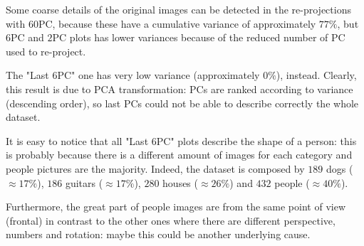 \documentclass[a4paper, 11pt]{article}
\begin{document}
	Some coarse details of the original images can be detected in the re-projections with $60$PC, because these have a cumulative variance of approximately $77\%$, but $6$PC and $2$PC plots has lower variances because of the reduced number of PC used to re-project.
	
	The "Last $6$PC" one has very low variance (approximately $0\%$), instead. Clearly, this result is due to PCA transformation: PCs are ranked according to variance (descending order), so last PCs could not be able to describe correctly the whole dataset.
	
	It is easy to notice that all "Last $6$PC" plots describe the shape of a person: this is probably because there is a different amount of images for each category and people pictures are the majority. Indeed, the dataset is composed by $189$ dogs ($\approx17\%$), $186$ guitars ($\approx17\%$), $280$ houses ($\approx26\%$) and $432$ people ($\approx40\%$).
	
	Furthermore, the great part of people images are from the same point of view (frontal) in contrast to the other ones where there are different perspective, numbers and rotation: maybe this could be another underlying cause.
		
\end{document}
